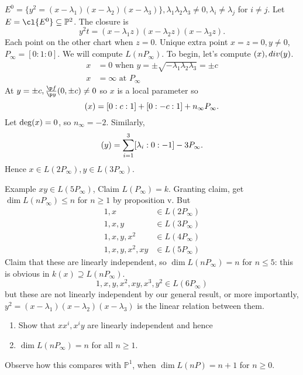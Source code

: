 \documentclass[a4paper]{article}
\renewcommand*{\P}{\mathbb{P}}
\let\div\relax
\begin{document}
\begin{eg}
  \(E^0 = \{y^2 = (x - \lambda_1)(x - \lambda_2)(x - \lambda_3)\}, \lambda_1\lambda_2\lambda_3 \neq 0, \lambda_i \neq \lambda_j\) for \(i \neq j\). Let \(E = \cl{E^0} \subseteq \P^2\). The closure is
  \[
    y^2t = (x - \lambda_1z)(x - \lambda_2z)(x - \lambda_3z).
  \]
  Each point on the other chart when \(z = 0\). Unique extra point \(x = z = 0, y \neq 0\), \(P_\infty = [0:1:0]\). We will compute \(L(nP_\infty)\). To begin, let's compute \(\div(x), div(y)\).
  \begin{align*}
    x &= 0 \text{ when } y = \pm \sqrt{-\lambda_1\lambda_2\lambda_3} = \pm c \\
    x &= \infty \text{ at } P_\infty
  \end{align*}
  At \(y = \pm c, \frac{\p f}{\p y} (0, \pm c) \neq 0\) so \(x\) is a local parameter so
  \[
    \div(x) = [0: c: 1] + [0: -c: 1] + n_\infty P_\infty.
  \]
  Let \(\deg \div(x) = 0\), so \(n_\infty = -2\). Similarly,
  \[
    \div(y) = \sum_{i = 1}^3 [\lambda_i: 0: -1] - 3 P_\infty.
  \]
  Hence \(x \in L(2 P_\infty), y \in L(3 P_\infty)\).

  Example \(xy \in L(5P_\infty)\), Claim \(L(P_\infty) = k\). Granting claim, get \(\dim L(nP_\infty) \leq n\) for \(n \geq 1\) by proposition v. But
  \begin{align*}
    1, x &\in L(2P_\infty) \\
    1, x, y &\in L(3P_\infty) \\
    1, x, y, x^2 &\in L(4P_\infty) \\
    1, x, y, x^2, xy &\in L(5P_\infty)
  \end{align*}
  Claim that these are linearly independent, so \(\dim L(nP_\infty) = n\) for \(n \leq 5\): this is obvious in \(k(x) \supseteq L(nP_\infty)\).
  \[
    1, x, y, x^2, xy, x^3, y^2 \in L(6P_\infty)
  \]
  but these are not linearly independent by our general result, or more importantly, \(y^2 = (x - \lambda_1)(x - \lambda_2)(x - \lambda_3)\) is the linear relation between them.
  \begin{ex}\leavevmode
    \begin{enumerate}
    \item Show that \(xx^i, x^iy\) are linearly independent and hence
    \item \(\dim L(nP_\infty) = n\) for all \(n \geq 1\).
    \end{enumerate}
  \end{ex}

  Observe how this compares with \(\P^1\), when \(\dim L(nP) = n + 1\) for \(n \geq 0\).


\end{eg}
\end{document}
